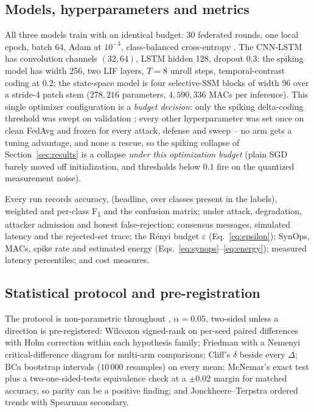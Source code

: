 \subsection{Models, hyperparameters and metrics}
\label{sec:design-models}

All three models train with an identical budget: 30 federated rounds,
one local epoch, batch 64, Adam at $10^{-3}$, class-balanced
cross-entropy \cite{cui2019}. The CNN-LSTM has convolution channels
$(32,64)$, LSTM hidden 128, dropout $0.3$; the spiking model has width
256, two LIF layers, $T=8$ unroll steps, temporal-contrast coding at
$0.2$; the state-space model is four selective-SSM blocks of width 96
over a stride-4 patch stem ($278{,}216$ parameters, $4{,}590{,}336$ MACs
per inference). This single optimizer configuration is a \emph{budget
decision}: only the spiking delta-coding threshold was swept on
validation \macroF{}; every other hyperparameter was set once on clean
FedAvg and frozen for every attack, defense and sweep -- no arm gets a
tuning advantage, and none a rescue, so the spiking collapse of
Section~\ref{sec:results} is a collapse \emph{under this optimization
budget} (plain SGD barely moved off initialization, and thresholds below
$0.1$ fire on the quantized measurement noise).

Every run records accuracy, \macroF{} (headline, over classes present in
the labels), weighted and per-class F\textsubscript{1} and the confusion
matrix; under attack, degradation, attacker admission and honest
false-rejection; consensus messages, simulated latency and the
rejected-set trace; the R\'enyi budget $\varepsilon$
(Eq.~\ref{eq:epsilon}); SynOps, MACs, spike rate and estimated energy
(Eqs.~\ref{eq:synops}--\ref{eq:energy}); measured latency percentiles;
and cost measures.

\subsection{Statistical protocol and pre-registration}
\label{sec:design-stats}

The protocol is non-parametric throughout \cite{demsar2006},
$\alpha=0.05$, two-sided unless a direction is pre-registered: Wilcoxon
signed-rank on per-seed paired differences with Holm correction
\cite{holm1979} within each hypothesis family; Friedman with a Nemenyi
critical-difference diagram for multi-arm comparisons; Cliff's $\delta$
\cite{cliff1993} beside every $\Delta$\macroF{}; BCa bootstrap
intervals ($10\,000$ resamples) on every mean; McNemar's exact test plus
a two-one-sided-tests equivalence check at a $\pm0.02$ margin for matched
accuracy, so parity can be a positive finding; and Jonckheere--Terpstra
ordered trends with Spearman secondary.

